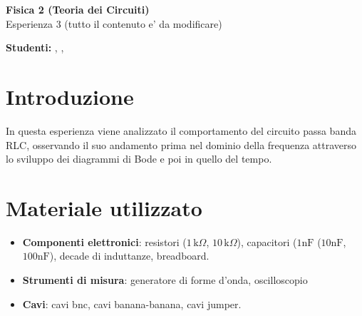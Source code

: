 



\begin{Huge}
\textsf{\textbf{Fisica 2 (Teoria dei Circuiti)}}\\
Esperienza 3 (tutto il contenuto e' da modificare)
\end{Huge}

\vspace{1ex}

\textsf{\textbf{Studenti:}} ,  , 

\vspace{2ex}

\section{Introduzione}
In questa esperienza viene analizzato il comportamento del circuito passa banda RLC, osservando il suo
andamento prima nel dominio della frequenza attraverso lo sviluppo dei diagrammi di Bode e poi in quello
del tempo.

\section{Materiale utilizzato}
\begin{itemize}
    \item \textbf{Componenti elettronici}: resistori (\(1 \, \text{k}\Omega\), \(10 \, \text{k}\Omega\)), capacitori (\(1\text{nF}\) (\(10 \text{nF}\), \(100\text{nF}\)), decade di induttanze, breadboard.
    \item \textbf{Strumenti di misura}: generatore di forme d'onda, oscilloscopio
    \item \textbf{Cavi}: cavi bnc, cavi banana-banana, cavi jumper.
\end{itemize}

